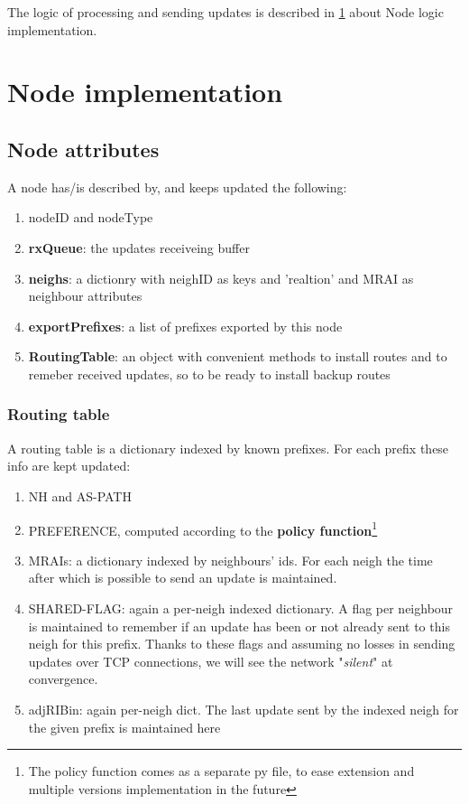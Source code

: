 \documentclass[fleqn,10pt]{SelfArx} %
\begin{document}
The logic of processing and sending updates is described in \cref{sec:nodeLogic} about Node logic implementation.

\section{Node implementation}\label{sec:nodeLogic}

\subsection*{Node attributes}
A node has/is described by, and keeps updated the following:
\begin{enumerate}[noitemsep]
  \item nodeID and nodeType
  \item \textbf{rxQueue}: the updates receiveing buffer
  \item \textbf{neighs}: a dictionry with neighID as keys and 'realtion' and MRAI as neighbour attributes
  \item \textbf{exportPrefixes}: a list of prefixes exported by this node
  \item \textbf{RoutingTable}: an object with convenient methods to install routes and to remeber received updates, so to be ready to install backup routes
\end{enumerate}

\subsubsection*{Routing table}
A routing table is a dictionary indexed by known prefixes. For each prefix these info are kept updated:
\begin{enumerate}[noitemsep]
  \item NH and AS-PATH
  \item PREFERENCE, computed according to the \textbf{policy function}\footnote{The policy function comes as a separate py file, to ease extension and multiple versions implementation in the future}
  \item MRAIs: a dictionary indexed by neighbours' ids. For each neigh the time after which is possible to send an update is maintained.
  \item SHARED-FLAG: again a per-neigh indexed dictionary. A flag per neighbour is maintained to remember if an update has been or not already sent to this neigh for this prefix. Thanks to these flags and assuming no losses in sending updates over TCP connections, we will see the network "\textit{silent}" at convergence.
  \item adjRIBin: again per-neigh dict. The last update sent by the indexed neigh for the given prefix is maintained here
\end{enumerate}
\end{document}
